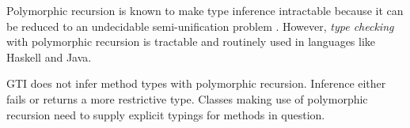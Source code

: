 Polymorphic recursion is known to make type inference intractable
\cite{DBLP:journals/toplas/Henglein93,DBLP:journals/toplas/KfouryTU93}
because it can be reduced to an undecidable semi-unification problem
\cite{DBLP:journals/iandc/KfouryTU93}. However, \emph{type checking} with
polymorphic recursion is tractable and routinely used in languages like Haskell
and Java.

GTI does not infer method types with polymorphic recursion. Inference either fails or
returns a more restrictive type. Classes making use of polymorphic recursion need to supply
explicit typings for methods in question. 



